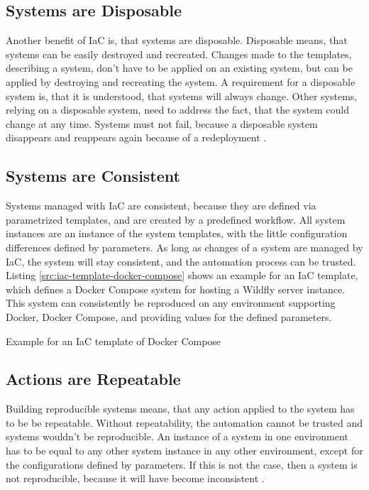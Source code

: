 \subsection{Systems are Disposable}
\label{sec:iac-principles-disposable}
Another benefit of IaC is, that systems are disposable. Disposable means, that systems can be easily destroyed and recreated. Changes made to the templates, describing a system, don't have to be applied on an existing system, but can be applied by destroying and recreating the system. A requirement for a disposable system is, that it is understood, that systems will always change. Other systems, relying on a disposable system, need to address the fact, that the system could change at any time. Systems must not fail, because a disposable system disappears and reappears again because of a redeployment \cite{Morris2016}.

\subsection{Systems are Consistent}
\label{sec:iac-principles-consistency}
Systems managed with IaC are consistent, because they are defined via parametrized templates, and are created by a predefined workflow. All system instances are an instance of the system templates, with the little configuration differences defined by parameters. As long as changes of a system are managed by IaC, the system will stay consistent, and the automation process can be trusted. \\

Listing \vref{src:iac-template-docker-compose} shows an example for an IaC template, which defines a Docker Compose system for hosting a Wildfly server instance. This system can consistently be reproduced on any environment supporting Docker, Docker Compose, and providing values for the defined parameters\cite{Wildfly2017, DockerCompose2018}. \\

\begin{code}
	\caption{Example for an IaC template of Docker Compose}
	\label{src:iac-template-docker-compose}
\end{code}

\subsection{Actions are Repeatable}
\label{sec:iac-principles-repeatability}
Building reproducible systems means, that any action applied to the system has to be be repeatable. Without repeatability, the automation cannot be trusted and systems wouldn't be reproducible. An instance of a system in one environment has to be equal to any other system instance in any other  environment, except for the configurations defined by parameters. If this is not the case, then a system is not reproducible, because it will have become inconsistent \cite{Morris2016}. \\

